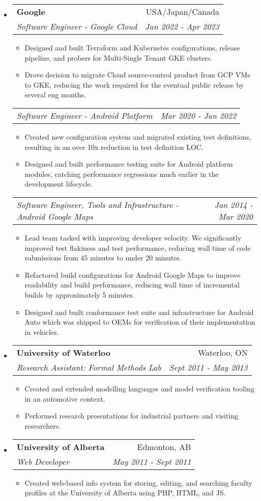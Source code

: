 \documentclass[letterpaper,11pt]{article}
\makeatletter
\newcommand{\resitem}[1]{\item #1 \vspace{-2pt}}
\newcommand{\ressubheading}[4]{
\begin{tabular*}{6.5in}{l@{\cftdotfill{\cftsecdotsep}\extracolsep{\fill}}r}
		\textbf{#1} & #2 \\
		\textit{#3} & \textit{#4} \\
\end{tabular*}\vspace{-6pt}}
\newcommand{\ressubsubheading}[2]{
\begin{tabular*}{6.5in}{l@{\cftdotfill{\cftsecdotsep}\extracolsep{\fill}}r}
	\textit{#1} & \textit{#2} \\
\end{tabular*}\vspace{-6pt}}
\makeatother
\begin{document}
\begin{itemize}[leftmargin=*]
\item[]
	\ressubheading{Google}{USA/Japan/Canada}{Software Engineer - Google Cloud}{Jan 2022 - Apr 2023}
	\begin{itemize}
		\resitem{Designed and built Terraform and Kubernetes configurations, release pipeline, and probers for Multi-Single Tenant GKE clusters.}
		\resitem{Drove decision to migrate Cloud source-control product from GCP VMs to GKE, reducing the work required for the eventual public release by several eng months.}
	\end{itemize}
	\ressubsubheading{Software Engineer - Android Platform}{Mar 2020 - Jan 2022}
	\begin{itemize}
		\resitem{Created new configuration system and migrated existing test definitions, resulting in an over 10x reduction in test definition LOC.}
		\resitem{Designed and built performance testing suite for Android platform modules, catching performance regressions much earlier in the development lifecycle.}
	\end{itemize}
	\ressubsubheading{Software Engineer, Tools and Infrastructure - Android Google Maps}{Jan 2014 - Mar 2020}
	\begin{itemize}
		\resitem{Lead team tasked with improving developer velocity. We significantly improved test flakiness and test performance, reducing wall time of code submissions from 45 minutes to under 20 minutes.}
		\resitem{Refactored build configurations for Android Google Maps to improve readability and build performance, reducing wall time of incremental builds by approximately 5 minutes.}
		\resitem{Designed and built conformance test suite and infrastructure for Android Auto which was shipped to OEMs for verification of their implementation in vehicles.}
	\end{itemize}

\item[]
	\ressubheading{University of Waterloo}{Waterloo, ON}{Research Assistant: Formal Methods Lab}{Sept 2011 - May 2013}
	\ifdefined\longresume
		\begin{itemize}
			\resitem{Created and extended modelling languages and model verification tooling in an automotive context.}
			\resitem{Performed research presentations for industrial partners and visiting researchers.}
		\end{itemize}
	\fi

\item[]
	\ressubheading{University of Alberta}{Edmonton, AB}{Web Developer}{May 2011 - Sept 2011}
	\ifdefined\longresume
		\begin{itemize}
			\resitem{Created web-based info system for storing, editing, and searching faculty profiles at the University of Alberta using PHP, HTML, and JS.}
		\end{itemize}
	\fi


\end{itemize}
\end{document}
